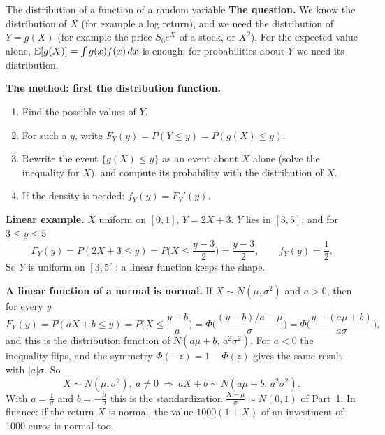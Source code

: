 \begin{key}{The distribution of a function of a random variable}
	\setlength{\parskip}{5pt}
	\textbf{The question.} We know the distribution of $X$ (for example a
	log return), and we need the distribution of $Y=g(X)$ (for example the
	price $S_0e^X$ of a stock, or $X^2$). For the expected value alone,
	$\operatorname{E}[g(X)]=\int g(x)f(x)\,dx$ is enough; for probabilities about $Y$ we
	need its distribution.

	\textbf{The method: first the distribution function.}
	\begin{enumerate}[nosep,label=\arabic*.]
		\item Find the possible values of $Y$.
		\item For such a $y$, write $F_Y(y)=P(Y\le y)=P(g(X)\le y)$.
		\item Rewrite the event $\{g(X)\le y\}$ as an event about $X$ alone
		      (solve the inequality for $X$), and compute its probability with
		      the distribution of $X$.
		\item If the density is needed: $f_Y(y)=F_Y'(y)$.
	\end{enumerate}

	\textbf{Linear example.} $X$ uniform on $[0,1]$, $Y=2X+3$. $Y$ lies in
	$[3,5]$, and for $3\le y\le5$
	\[ F_Y(y)=P(2X+3\le y)=P\Big(X\le\frac{y-3}{2}\Big)=\frac{y-3}{2},\qquad
		f_Y(y)=\frac12. \]
	So $Y$ is uniform on $[3,5]$: a linear function keeps the shape.

	\textbf{A linear function of a normal is normal.} If $X\sim N(\mu,\sigma^2)$
	and $a>0$, then for every $y$
	\[ F_Y(y)=P(aX+b\le y)=P\Big(X\le\frac{y-b}{a}\Big)
		=\Phi\Big(\frac{(y-b)/a-\mu}{\sigma}\Big)
		=\Phi\Big(\frac{y-(a\mu+b)}{a\sigma}\Big), \]
	and this is the distribution function of $N(a\mu+b,\,a^2\sigma^2)$. For
	$a<0$ the inequality flips, and the symmetry $\Phi(-z)=1-\Phi(z)$ gives
	the same result with $|a|\sigma$. So
	\[ X\sim N(\mu,\sigma^2),\ a\ne0\ \Longrightarrow\ aX+b\sim
		N(a\mu+b,\,a^2\sigma^2). \]
	With $a=\frac1\sigma$ and $b=-\frac\mu\sigma$ this is the standardization
	$\frac{X-\mu}{\sigma}\sim N(0,1)$ of Part~1. In finance: if the return
	$X$ is normal, the value $1000(1+X)$ of an investment of 1000 euros is
	normal too.


\end{key}
